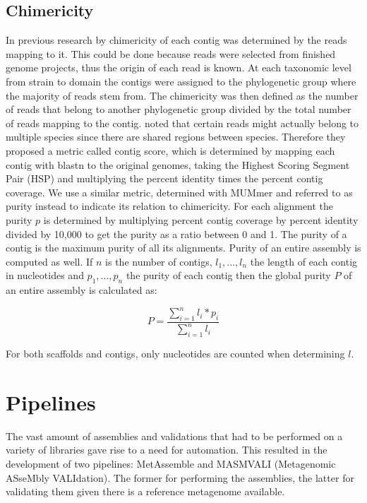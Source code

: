 \documentclass[a4paper,12pt]{report}
\begin{document}
\subsection{Chimericity}
\label{sec:chimer}
In previous research by \citet{Mavromatis17468765} chimericity of
each contig was determined by the reads mapping to it. This could be done
because reads were selected from finished genome projects, thus 
the origin of each read is known. At each taxonomic level from strain to domain the
contigs were assigned to the phylogenetic group where the majority of reads
stem from. The chimericity was then defined as the number of
reads that belong to another phylogenetic group divided by the total number of
reads mapping to the contig.  \citet{Mende22384016} noted that certain
reads might actually belong to multiple species since there are shared regions between species.
Therefore they proposed a metric called contig score, which is determined by mapping
each contig with blastn to the original genomes, taking the Highest Scoring
Segment Pair (HSP) and multiplying the percent identity times the percent
contig coverage. We use a similar metric, determined with MUMmer
and referred to as purity instead to indicate its relation to chimericity. For
each alignment the purity $p$ is determined by multiplying percent contig
coverage by percent identity divided by 10,000 to get the purity as a ratio
between 0 and 1. The purity of a contig is the maximum purity of all its
alignments. Purity of an entire assembly is computed as well. If $n$ is the
number of contigs, $l_1,...,l_n$ the length of each contig in nucleotides and
$p_1,...,p_n$ the purity of each contig then the global purity $P$ of an entire
assembly is calculated as:

\begin{equation}
P = \frac{\sum_{i=1}^n l_{i} * p_{i}}{\sum_{i=1}^{n} l_{i}}
\end{equation}

For both scaffolds and contigs, only nucleotides are counted when determining
$l$.\\


\section{Pipelines} The vast amount of assemblies and validations that had to
be performed on a variety of libraries gave rise to a need for automation. This
resulted in the development of two pipelines: MetAssemble and MASMVALI
(Metagenomic ASseMbly VALIdation). The former for performing the assemblies,
the latter for validating them given there is a reference metagenome available.
\end{document}
